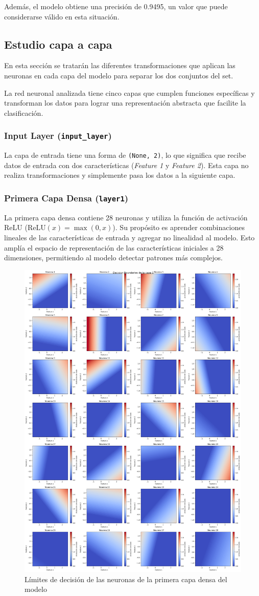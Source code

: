 \documentclass[paper=a4, fontsize=11pt]{scrartcl} %
\numberwithin{equation}{section} %
\numberwithin{figure}{section} %
\numberwithin{table}{section} %
\begin{document}
Además, el modelo obtiene una precisión de 0.9495, un valor que puede considerarse válido en esta situación. 

\subsection{Estudio capa a capa}

En esta sección se tratarán las diferentes transformaciones que aplican las neuronas en cada capa del modelo para separar los dos conjuntos del set. 


La red neuronal analizada tiene cinco capas que cumplen funciones específicas y transforman los datos para lograr una representación abstracta que facilite la clasificación.
\newpage

\subsubsection{Input Layer (\texttt{input\_layer})}
La capa de entrada tiene una forma de \texttt{(None, 2)}, lo que significa que recibe datos de entrada con dos características (\textit{Feature 1} y \textit{Feature 2}). Esta capa no realiza transformaciones y simplemente pasa los datos a la siguiente capa.


\subsubsection{Primera Capa Densa (\texttt{layer1})}
La primera capa densa contiene 28 neuronas y utiliza la función de activación ReLU (\( \text{ReLU}(x) = \max(0, x) \)). Su propósito es aprender combinaciones lineales de las características de entrada y agregar no linealidad al modelo. Esto amplía el espacio de representación de las características iniciales a 28 dimensiones, permitiendo al modelo detectar patrones más complejos.


\begin{figure}[H]
  \centering
  \includegraphics[width=.6\linewidth]{images/plot_neuronas_L1.png}
  \caption{Límites de decisión de las neuronas de la primera capa densa del modelo}
  \label{fig:sub1}
\end{figure}
\end{document}
